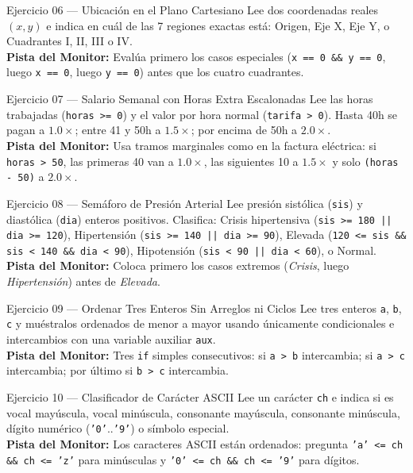 \documentclass[11pt,letterpaper]{article}
\begin{document}
\begin{ejercicio}{Ejercicio 06 --- Ubicación en el Plano Cartesiano}
Lee dos coordenadas reales $(x, y)$ e indica en cuál de las 7 regiones exactas está: Origen, Eje X, Eje Y, o Cuadrantes I, II, III o IV.\\
\textbf{Pista del Monitor:} Evalúa primero los casos especiales (\texttt{x == 0 \&\& y == 0}, luego \texttt{x == 0}, luego \texttt{y == 0}) antes que los cuatro cuadrantes.
\end{ejercicio}

\begin{ejercicio}{Ejercicio 07 --- Salario Semanal con Horas Extra Escalonadas}
Lee las horas trabajadas (\texttt{horas >= 0}) y el valor por hora normal (\texttt{tarifa > 0}). Hasta 40h se pagan a $1.0\times$; entre 41 y 50h a $1.5\times$; por encima de 50h a $2.0\times$.\\
\textbf{Pista del Monitor:} Usa tramos marginales como en la factura eléctrica: si \texttt{horas > 50}, las primeras 40 van a $1.0\times$, las siguientes 10 a $1.5\times$ y solo \texttt{(horas - 50)} a $2.0\times$.
\end{ejercicio}

\begin{ejercicio}{Ejercicio 08 --- Semáforo de Presión Arterial}
Lee presión sistólica (\texttt{sis}) y diastólica (\texttt{dia}) enteros positivos. Clasifica: Crisis hipertensiva (\texttt{sis >= 180 || dia >= 120}), Hipertensión (\texttt{sis >= 140 || dia >= 90}), Elevada (\texttt{120 <= sis \&\& sis < 140 \&\& dia < 90}), Hipotensión (\texttt{sis < 90 || dia < 60}), o Normal.\\
\textbf{Pista del Monitor:} Coloca primero los casos extremos (\textit{Crisis}, luego \textit{Hipertensión}) antes de \textit{Elevada}.
\end{ejercicio}

\begin{ejercicio}{Ejercicio 09 --- Ordenar Tres Enteros Sin Arreglos ni Ciclos}
Lee tres enteros \texttt{a}, \texttt{b}, \texttt{c} y muéstralos ordenados de menor a mayor usando únicamente condicionales e intercambios con una variable auxiliar \texttt{aux}.\\
\textbf{Pista del Monitor:} Tres \texttt{if} simples consecutivos: si \texttt{a > b} intercambia; si \texttt{a > c} intercambia; por último si \texttt{b > c} intercambia.
\end{ejercicio}

\begin{ejercicio}{Ejercicio 10 --- Clasificador de Carácter ASCII}
Lee un carácter \texttt{ch} e indica si es vocal mayúscula, vocal minúscula, consonante mayúscula, consonante minúscula, dígito numérico (\texttt{'0'}..\texttt{'9'}) o símbolo especial.\\
\textbf{Pista del Monitor:} Los caracteres ASCII están ordenados: pregunta \texttt{'a' <= ch \&\& ch <= 'z'} para minúsculas y \texttt{'0' <= ch \&\& ch <= '9'} para dígitos.
\end{ejercicio}
\end{document}
